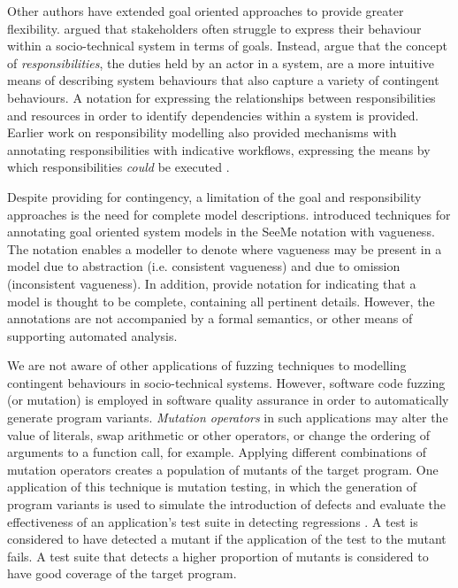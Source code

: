 \documentclass{sig-alternate}
\begin{document}
Other authors have extended goal oriented approaches to provide greater flexibility.  \citet{sommerville09deriving}
argued that stakeholders often struggle to express their behaviour within a socio-technical system in terms of goals.
Instead, \citeauthor{sommerville09deriving} argue that the concept of \emph{responsibilities}, the duties held by an
actor in a system, are a more intuitive means of describing system behaviours that also capture a variety of contingent
behaviours.  A notation for expressing the relationships between responsibilities and resources in order to identify
dependencies within a system is provided.  Earlier work on responsibility modelling also provided mechanisms with
annotating responsibilities with indicative workflows, expressing the means by which responsibilities \emph{could} be
executed \citep{dewsbury07responsibility}.

Despite providing for contingency, a limitation of the goal and responsibility approaches is the need for complete model
descriptions. \citet{Herrmann1999} introduced techniques for annotating goal oriented system models in the SeeMe
notation with vagueness.  The notation enables a modeller to denote where vagueness may be present in a model due to
abstraction (i.e. consistent vagueness) and due to omission (inconsistent vagueness).  In addition,
\citeauthor{Herrmann1999} provide notation for indicating that a model is thought to be complete, containing all
pertinent details.  However, the annotations are not accompanied by a formal semantics, or other means of supporting
automated analysis.

We are not aware of other applications of fuzzing techniques to modelling contingent behaviours in socio-technical
systems.  However, software code fuzzing (or mutation) is employed in software quality assurance in order to
automatically generate program variants.  \emph{Mutation operators} in such applications may alter the value of
literals, swap arithmetic or other operators, or change the ordering of arguments to a function call, for example.
Applying different combinations of mutation operators creates a population of mutants of the target program.  One
application of this technique is mutation testing, in which the generation of program variants is used to simulate the
introduction of defects and evaluate the effectiveness of an application's test suite in detecting regressions
\citep{demillo78hints}.  A test is considered to have detected a mutant if the application of the test to the mutant
fails.  A test suite that detects a higher proportion of mutants is considered to have good coverage of the target
program.
\end{document}
